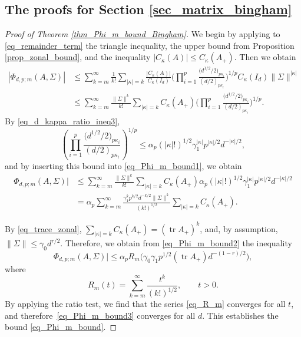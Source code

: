 \documentclass[pdftex]{sigma}
\numberwithin{equation}{section}
\def\tr {\mathop{\mathrm{tr}}}
\begin{document}
\subsection[The proofs for Section 2]{The proofs for Section \ref{sec_matrix_bingham}}
\label{sec_proofs_Phi_bounds}

\begin{proof}[Proof of Theorem \ref{thm_Phi_m_bound_Bingham}]
We begin by applying to \eqref{eq_remainder_term} the triangle inequality, the upper bound from Proposition \ref{prop_zonal_bound}, and the inequality $|C_\kappa(A)| \le C_\kappa(A_+)$. Then we obtain
\begin{align}
\label{eq_Phi_m_bound1}
|\Phi_{d,p;m}(A,\Sigma)| &\le \sum_{k=m}^\infty \frac{1}{k!} \sum_{|\kappa|=k} \frac{|C_\kappa(A)|}{C_\kappa(I_d)} \Bigg(\prod_{i=1}^p \frac{\bigl(d^{1/2}/2\bigr)_{p \kappa_i}}{(d/2)_{p \kappa_i}}\Bigg)^{1/p} C_\kappa(I_d) \|\Sigma\|^{|\kappa|} \nonumber \\
&\le \sum_{k=m}^\infty \frac{\|\Sigma\|^k}{k!} \sum_{|\kappa|=k} C_\kappa(A_+) \Bigg(\prod_{i=1}^p \frac{\bigl(d^{1/2}/2\bigr)_{p \kappa_i}}{(d/2)_{p \kappa_i}}\Bigg)^{1/p}.
\end{align}
By \eqref{eq_d_kappa_ratio_ineq3},
\[
\left(\prod_{i=1}^p \frac{\bigl(d^{1/2}/2\bigr)_{p \kappa_i}}{(d/2)_{p \kappa_i}}\right)^{1/p} \le \alpha_p (|\kappa|!)^{1/2} \gamma_1^{|\kappa|} p^{|\kappa|/2} d^{-|\kappa|/2},
\]
and by inserting this bound into \eqref{eq_Phi_m_bound1}, we obtain
\begin{align}
\label{eq_Phi_m_bound2}
\Phi_{d,p;m}(A,\Sigma)| &\le \sum_{k=m}^\infty \frac{\|\Sigma\|^k}{k!} \sum_{|\kappa|=k} C_\kappa(A_+) \alpha_p (|\kappa|!)^{1/2} \gamma_1^{|\kappa|} p^{|\kappa|/2} d^{-|\kappa|/2} \nonumber \\
&= \alpha_p \sum_{k=m}^\infty \frac{\gamma_1^k p^{k/2} d^{-k/2} \|\Sigma\|^k}{(k!)^{1/2}} \sum_{|\kappa|=k} C_\kappa(A_+).
\end{align}

By \eqref{eq_trace_zonal},
$
\sum_{|\kappa|=k} C_\kappa(A_+) = (\tr A_+)^k$,
and, by assumption, $\|\Sigma\| \le \gamma_0 d^{r/2}$. Therefore, we obtain from \eqref{eq_Phi_m_bound2} the inequality
\begin{equation}
\label{eq_Phi_m_bound3}
\Phi_{d,p;m}(A,\Sigma)| \le \alpha_p R_m\bigl(\gamma_0 \gamma_1 p^{1/2} (\tr A_+) d^{-(1-r)/2}\bigr),
\end{equation}
where
\begin{equation}
\label{eq_R_m}
R_m(t) = \sum_{k=m}^\infty \frac{t^k}{(k!)^{1/2}},\qquad t > 0.
\end{equation}
By applying the ratio test, we find that the series \eqref{eq_R_m} converges for all $t$, and therefore~\eqref{eq_Phi_m_bound3} converges for all $d$. This establishes the bound \eqref{eq_Phi_m_bound}.


\end{proof}
\end{document}
